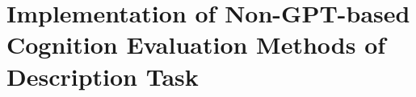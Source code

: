 






\section{Implementation of Non-GPT-based Cognition Evaluation Methods of Description Task}
\label{sec:eval_gpt_eval}


